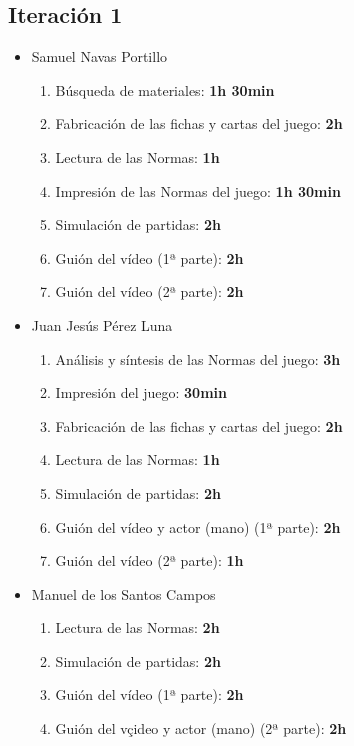 \documentclass[11 pt]{book}
\begin{document}
	    \subsection*{Iteración 1}
		    \begin{itemize}
			    \item Samuel Navas Portillo
				    \begin{enumerate}
					    \item Búsqueda de materiales: \textbf{1h 30min}
					    \item Fabricación de las fichas y cartas del juego: \textbf{2h}
					    \item Lectura de las Normas: \textbf{1h}
					    \item Impresión de las Normas del juego: \textbf{1h 30min}
					    \item Simulación de partidas: \textbf{2h}
					    \item Guión del vídeo (1ª parte): \textbf{2h}
					    \item Guión del vídeo (2ª parte): \textbf{2h}
				    \end{enumerate}
			    \item Juan Jesús Pérez Luna
				    \begin{enumerate}
					    \item Análisis y síntesis de las Normas del juego: \textbf{3h}
					    \item Impresión del juego: \textbf{30min}
					    \item Fabricación de las fichas y cartas del juego: \textbf{2h}
					    \item Lectura de las Normas: \textbf{1h}
					    \item Simulación de partidas: \textbf{2h}
					    \item Guión del vídeo y actor (mano) (1ª parte): \textbf{2h}
					    \item Guión del vídeo (2ª parte): \textbf{1h}
				    \end{enumerate}
			    \item Manuel de los Santos Campos
				    \begin{enumerate}
					    \item Lectura de las Normas: \textbf{2h}
					    \item Simulación de partidas: \textbf{2h}
					    \item Guión del vídeo (1ª parte): \textbf{2h}
					    \item Guión del vçideo y actor (mano) (2ª parte): \textbf{2h}
				    \end{enumerate}

\end{itemize}
\end{document}
